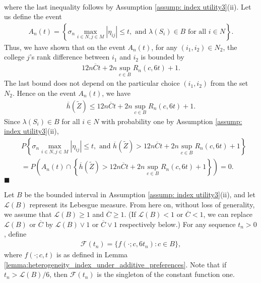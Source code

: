 \documentclass[12pt, fullpage]{amsart}
\theoremstyle{definition}
\theoremstyle{definition}
\theoremstyle{definition}
\begin{document}
\begin{bibunit}[econometrica]
\begin{align*}
\end{align*}
where the last inequality follows by Assumption \ref{assump: index utility3}(ii). Let us define the event
\begin{align*}
	A_n(t) = \left\{\sigma_n \max_{i \in N,j \in M} |\eta_{ij}| \le t, \text{ and } \lambda(S_i) \in B \text{ for all } i \in N \right\}.
\end{align*}
Thus, we have shown that on the event $A_n(t)$, for any $(i_1,i_2) \in N_2$, the college $j$'s rank difference between $i_1$ and $i_2$ is bounded by
\begin{align*}
	12 n \overline C t + 2 n  \sup_{c \in B} R_n(c, 6 t) + 1.
\end{align*}
The last bound does not depend on the particular choice $(i_1,i_2)$ from the set $N_2$. Hence on the event  $A_n(t)$, we have
\begin{align*}
	 \overline h(\tilde Z)  \le 12 n \overline C t + 2 n \sup_{c \in B} R_n(c, 6 t) + 1.
\end{align*}
Since $\lambda(S_i) \in B$ for all $i \in N$ with probability one by Assumption \ref{assump: index utility3}(ii),
\begin{align*}
	&P \left\{ \sigma_n \max_{i \in N,j \in M} |\eta_{ij}| \le t, \text{ and } \overline{h}(\tilde Z)  >  12 n \overline C t + 2 n \sup_{c \in B} R_n(c, 6 t) + 1 \right\}\\
	&=P \left(A_n(t) \cap \left\{ \overline{h}(\tilde Z)  >  12 n \overline C t + 2 n \sup_{c \in B} R_n(c, 6 t) + 1 \right\}\right) = 0.
\end{align*}
$\blacksquare$\medskip

Let $B$ be the bounded interval in Assumption \ref{assump: index utility3}(ii), and let $\mathcal{L}(B)$ represent its Lebesgue measure. From here on, without loss of generality, we assume that $\mathcal{L}(B) \ge 1$ and $\overline C \ge 1$. (If $\mathcal{L}(B) < 1$ or $\overline C < 1$, we can replace $\mathcal{L}(B)$ or $\overline C$ by $\mathcal{L}(B) \vee 1$ or $\overline C \vee 1$ respectively below.) For any sequence $t_n>0$, define
\begin{align*}
	\mathcal{F}(t_n) = \{f(\cdot; c,6t_n): c \in B\},
\end{align*}
where $f(\cdot; c, t)$ is as defined in Lemma \ref{lemma:heterogeneity_index_under_additive_preferences}. Note that if $t_n > \mathcal{L}(B)/6$, then $\mathcal{F}(t_n)$ is the singleton of the constant function one.


\end{bibunit}
\end{document}
